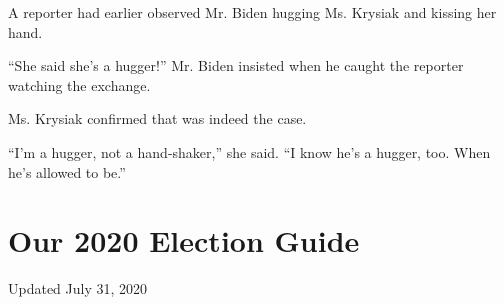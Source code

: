 A reporter had earlier observed Mr. Biden hugging Ms. Krysiak and
kissing her hand.

``She said she's a hugger!'' Mr. Biden insisted when he caught the
reporter watching the exchange.

Ms. Krysiak confirmed that was indeed the case.

``I'm a hugger, not a hand-shaker,'' she said. ``I know he's a hugger,
too. When he's allowed to be.''

\hypertarget{our-2020-election-guide}{%
\section{Our 2020 Election Guide}\label{our-2020-election-guide}}

Updated July 31, 2020

